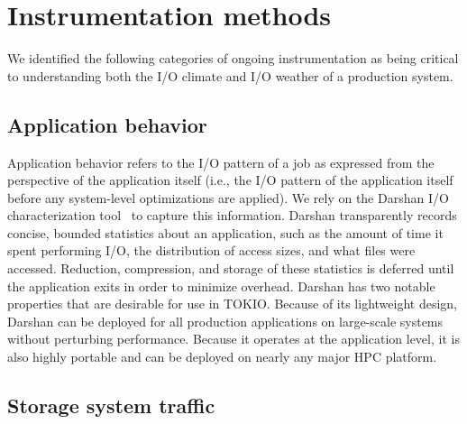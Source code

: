 \section{Instrumentation methods} \label{sec:methods}



We identified the following categories of ongoing instrumentation as being
critical to understanding both the I/O climate and I/O weather of a
production system.  

\subsection{Application behavior}
\label{sec:methods/darshan}

Application behavior refers to the I/O pattern of a job as expressed from
the perspective of the application itself (i.e., the I/O pattern of the
application itself before any system-level optimizations are applied).
We rely on the Darshan I/O characterization tool~\cite{carns200924}
to capture this information.  Darshan transparently records concise,
bounded statistics about an application, such as the amount of time it
spent performing I/O, the distribution of access sizes, and what files
were accessed.  Reduction, compression, and storage of these statistics
is deferred until the application exits in order to minimize overhead.
Darshan has two notable properties that are desirable for use in TOKIO.
Because of its lightweight design, Darshan can be deployed for all
production applications on large-scale systems without perturbing
performance.  Because it operates at the application level, it is also highly
portable and can be deployed on nearly any major HPC platform.

\subsection{Storage system traffic}

